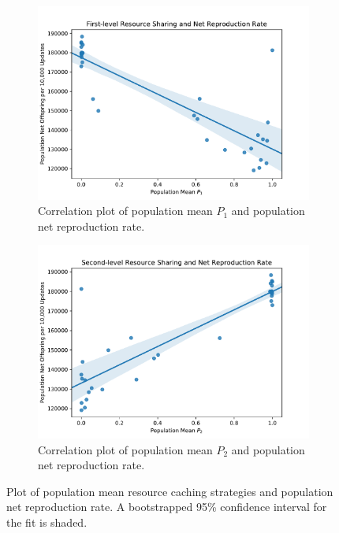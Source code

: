 \begin{figure}[t]
\begin{center}

\begin{subfigure}[b]{0.5\columnwidth}
  \includegraphics[width=\columnwidth]{img/mean_res_pool1_vs_net_reproduction}
  \caption{
  Correlation plot of population mean $P_1$ and population net reproduction rate.
  }
  \label{fig:mean_res_pool1_vs_net_reproduction}
\end{subfigure}%
\begin{subfigure}[b]{0.5\columnwidth}
  \includegraphics[width=\columnwidth]{img/mean_res_pool2_vs_net_reproduction}
  \caption{
  Correlation plot of population mean $P_2$ and population net reproduction rate.
  }
  \label{fig:mean_res_pool2_vs_net_reproduction}
\end{subfigure}
\caption{
Plot of population mean resource caching strategies and population net reproduction rate.
A bootstrapped 95\% confidence interval for the fit is shaded.
}
\label{fig:net_reproduction}
\end{center}
\end{figure}
